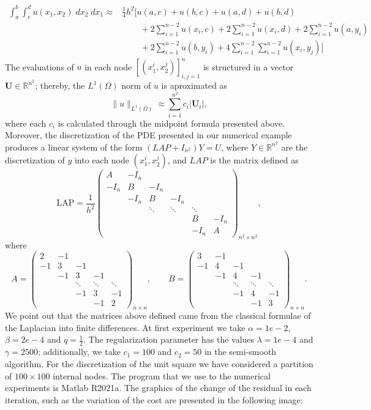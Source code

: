 \documentclass[11pt,a4paper]{amsart}
\newcommand{\reals}{\mathbb{R}}
\newcommand{\norm}[1]{\lVert #1 \rVert}
\begin{document}
\begin{align*}
    \int_{a}^{b}\int_{c}^{d}u(x_1,x_2)\; dx_2\;dx_1\approx& \frac{1}{4}h^2\Bigg[ u(a,c)+u(b,c)+u(a,d)+u(b,d)\\
    &\phantom{aaaa} +2\sum_{i=1}^{n-2}u(x_i,c)+2\sum_{i=1}^{n-2}u(x_i,d)+2\sum_{i=1}^{n-2}u(a,y_i)\\
    &\phantom{aaaa}+2\sum_{i=1}^{n-2}u(b,y_i)+4\sum_{i=1}^{n-2}\sum_{i=1}^{n-2}u(x_i,y_j)\Bigg]
\end{align*}
The evaluations of $u$ in each node $[(x_1^i, x_2^j)]_{i,j=1}^n$ is structured in a vector $\mathbf{U}\in \reals^{n^2}$; thereby, the $L^1(\Omega)$ norm of $u$ is aproximated as
\[    \norm{u}_{L^1(\Omega)}\approx\sum_{i=1}^{n^2}c_i|\mathbf{U}_i|,
\]
where each $c_i$ is calculated through the midpoint formula presented above. Moreover, the discretization of the PDE presented in our numerical example produces a linear system of the form $(LAP+I_{n^2})Y=U$, where $Y\in \mathbb{R}^{n^2}$ are the discretization of $y$ into each node $(x_1^i,x_2^j)$, and $LAP$ is the matrix defined as
\[
   \mbox{LAP}=\frac{1}{h^2} \begin{pmatrix}
    A&-I_n&\\
    -I_n&B&-I_n\\
    &-I_n&B&-I_n\\
    &&\ddots&\ddots&\ddots\\
    &&&&B&-I_n\\
    &&&&-I_n&A
    \end{pmatrix}_{n^2\times n^2},
\]
where
\[
    A=\begin{pmatrix}
    2&-1\\
    -1&3&-1\\
      &-1&3&-1\\
      &&\ddots&\ddots&\ddots\\
      &&-1&3&-1\\
      &&&-1&2
    \end{pmatrix}_{n\times n}, \qquad B=\begin{pmatrix}
    3&-1\\
    -1&4&-1\\
      &-1&4&-1\\
      &&\ddots&\ddots&\ddots\\
      &&-1&4&-1\\
      &&&-1&3
    \end{pmatrix}_{n\times n}.
\]
We point out that the matrices above defined came from the classical formulae of the Laplacian into finite differences. At first experiment we take $\alpha=1e-2$, $\beta=2e-4$ and $q=\frac{1}{2}$. The regularization parameter has the values $\lambda=1e-4$ and $\gamma=2500$; additionally, we take $c_1=100$ and $c_2=50$ in the semi-smooth algorithm. For the discretization of the unit square we have considered a partition of $100\times 100$ internal nodes. The program that we use to the numerical experiments is Matlab R2021a. The graphics of the change of the residual in each iteration, such as the variation of the cost are presented in the following image:
\end{document}
